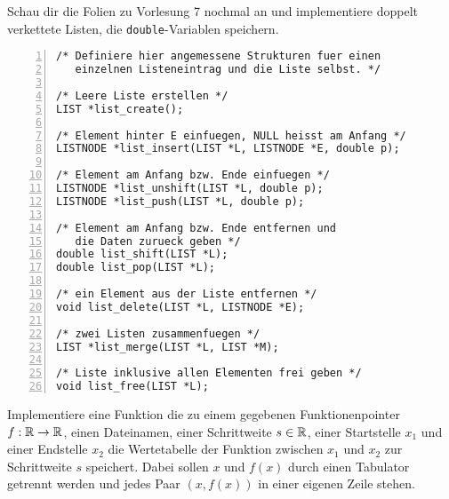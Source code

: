 \documentclass{uebungszettel}
\begin{document}
\begin{aufg} 
Schau dir die Folien zu Vorlesung 7 nochmal an und implementiere doppelt verkettete Listen, die \verb|double|-Variablen speichern.

\medskip\begin{codelisting}
\begin{lstlisting}[numbers=left,numberstyle=\tiny,frame=tlrb]
/* Definiere hier angemessene Strukturen fuer einen
   einzelnen Listeneintrag und die Liste selbst. */

/* Leere Liste erstellen */
LIST *list_create();

/* Element hinter E einfuegen, NULL heisst am Anfang */
LISTNODE *list_insert(LIST *L, LISTNODE *E, double p);

/* Element am Anfang bzw. Ende einfuegen */
LISTNODE *list_unshift(LIST *L, double p);
LISTNODE *list_push(LIST *L, double p);

/* Element am Anfang bzw. Ende entfernen und 
   die Daten zurueck geben */
double list_shift(LIST *L);
double list_pop(LIST *L);

/* ein Element aus der Liste entfernen */
void list_delete(LIST *L, LISTNODE *E);

/* zwei Listen zusammenfuegen */
LIST *list_merge(LIST *L, LIST *M);

/* Liste inklusive allen Elementen frei geben */
void list_free(LIST *L);

\end{lstlisting}
\end{codelisting}
\end{aufg}

\newpage
\begin{aufg} Implementiere eine Funktion die zu einem gegebenen Funktionenpointer $f:\mathbb{R} \rightarrow \mathbb{R}$, einen Dateinamen, einer Schrittweite $s \in \mathbb{R}$, einer Startstelle $x_1$ und einer Endstelle $x_2$ die Wertetabelle der Funktion zwischen $x_1$ und $x_2$ zur Schrittweite $s$ speichert. Dabei sollen $x$ und $f(x)$ durch einen Tabulator getrennt werden und jedes Paar $(x, f(x))$ in einer eigenen Zeile stehen.
\end{aufg}
\end{document}
